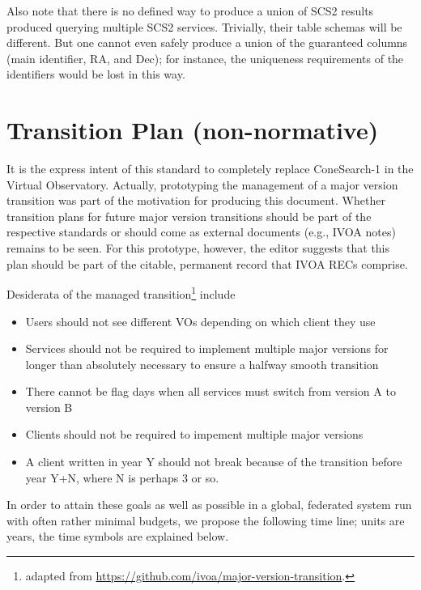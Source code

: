 \documentclass[11pt,a4paper]{ivoa}
\begin{document}
Also note that there is no defined way to produce a union of SCS2
results produced querying multiple SCS2 services.  Trivially, their
table schemas will be different.  But one cannot even safely produce a
union of the guaranteed columns (main identifier, RA, and Dec); for
instance, the uniqueness requirements of the identifiers would be lost
in this way.


\section{Transition Plan (non-normative)}

It is the express intent of this standard to completely replace
ConeSearch-1 in the Virtual Observatory.  Actually, prototyping the
management of a major version transition was part of the motivation for
producing this document.  Whether transition plans for future major
version transitions should be part of the respective standards or should
come as external documents (e.g., IVOA notes) remains to be seen.  For
this prototype, however, the editor suggests that this plan should be
part of the citable, permanent record that IVOA RECs comprise.

Desiderata of the managed transition\footnote{adapted from
\url{https://github.com/ivoa/major-version-transition}.} include

\begin{itemize}
\item Users should not see different VOs depending on which client they
use
\item Services should not be required to implement multiple major
versions for longer than absolutely necessary to ensure a halfway smooth
transition
\item There cannot be flag days when all services must switch from
version A to version B
\item Clients should not be required to impement multiple major versions
\item A client written in year Y should not break because of the
transition before year Y+N, where N is perhaps 3 or so.
\end{itemize}

In order to attain these goals as well as possible in a global,
federated system run with often rather minimal budgets, we propose the
following time line; units are years, the time symbols are explained
below.

\def\ts#1{$T_\textrm{\textnormal{\footnotesize #1}}$}
\end{document}
